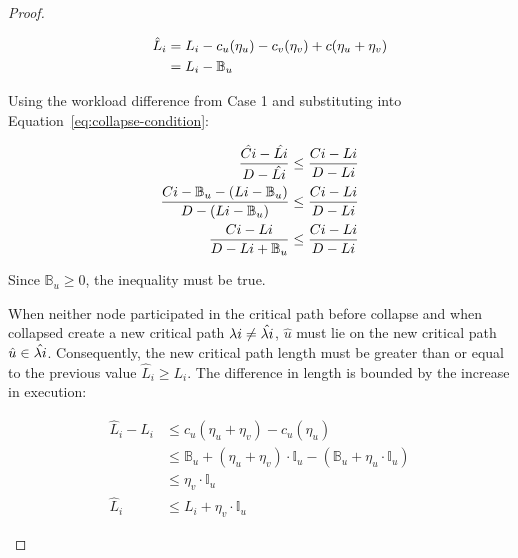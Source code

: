 \begin{theorem}
\begin{proof}
\begin{case}
      \begin{align*}
        \indent
        \hat{L}_i &= L_i - c_u(\eta_u) - c_v(\eta_v) + c(\eta_u +
            \eta_v) \\
        &= L_i - \mathbb{B}_u
      \end{align*}

      Using the workload difference from Case 1 and substituting into
      Equation~\ref{eq:collapse-condition}:

      \begin{align*}
        \indent
        \frac{\hat{\workload{i}} - \hat{\criticalpathlen{i}}} 
             {\Deadline{i} - \hat{\criticalpathlen{i}}} &\le
        \frac{\workload{i} - \criticalpathlen{i}} 
             {\Deadline{i} - \criticalpathlen{i}} \\
        \frac{\workload{i} - \mathbb{B}_u - (\criticalpathlen{i} - \mathbb{B}_u)}
             {\Deadline{i} - (\criticalpathlen{i} - \mathbb{B}_u)}
             &\le
        \frac{\workload{i} - \criticalpathlen{i}} 
             {\Deadline{i} - \criticalpathlen{i}} \\
        \frac{\workload{i} - \criticalpathlen{i}}
             {\Deadline{i} - \criticalpathlen{i} + \mathbb{B}_u}
             &\le
        \frac{\workload{i} - \criticalpathlen{i}} 
             {\Deadline{i} - \criticalpathlen{i}}
      \end{align*}

      Since ${\mathbb{B}_u \ge 0}$, the inequality must be true.
    \end{case}

    
    \begin{case}
      When neither node participated in the critical path before
      collapse and when collapsed create a new critical path
      ${\lambda{i} \not = \hat{\lambda{i}}}$, ${\hat{u}}$
      must lie on the new critical path
      ${\hat{u} \in \hat{\lambda{i}}}$. Consequently, the
      new critical path length must be greater than or equal to the
      previous value ${\hat{L}_i \ge L_i}$. The difference in length
      is bounded by the increase in execution:

      \begin{align*}
        \hat{L}_i - L_i &\le c_u(\eta_u + \eta_v) - c_u(\eta_u) \\
        &\le \mathbb{B}_u + (\eta_u + \eta_v) \cdot \mathbb{I}_u
            - (\mathbb{B}_u + \eta_u \cdot \mathbb{I}_u) \\
        &\le \eta_v \cdot \mathbb{I}_u \\
        \hat{L}_i & \le L_i + \eta_v \cdot \mathbb{I}_u
      \end{align*}


\end{case}
\end{proof}
\end{theorem}
